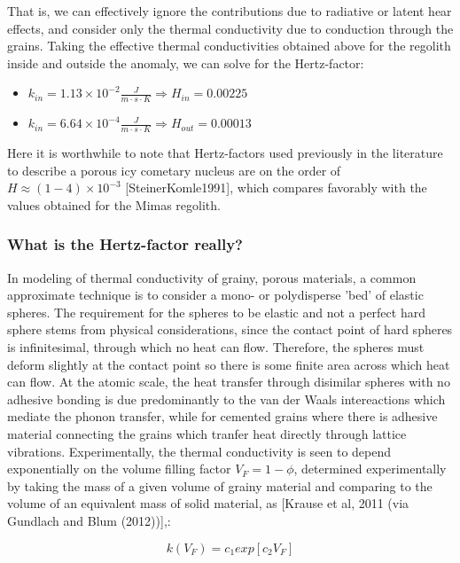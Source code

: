 \documentclass[11pt]{article} %
\newcommand{\vf}{\ensuremath{V_{F}}\xspace}
\begin{document}
	That is, we can effectively ignore the contributions due to radiative or latent hear effects, and consider only the thermal conductivity due to conduction through the grains. Taking the effective thermal conductivities obtained above for the regolith inside and outside the anomaly, we can solve for the Hertz-factor:
	
	\begin{itemize}
	\item $k_{in} = 1.13\times10^{-2} \frac{J}{m \cdot s \cdot K} \Rightarrow H_{in} = 0.00225$
	\item $k_{in} = 6.64\times10^{-4} \frac{J}{m \cdot s \cdot K} \Rightarrow H_{out} = 0.00013$
	\end{itemize}
	
	Here it is worthwhile to note that Hertz-factors used previously in the literature to describe a porous icy cometary nucleus are on the order of  $H  \approx (1 - 4) \times10^{-3}$ [SteinerKomle1991], which compares favorably with the values obtained for the Mimas regolith. 
	
\subsubsection{What is the Hertz-factor really?}

	In modeling of thermal conductivity of grainy, porous materials, a common approximate technique is to consider a mono- or polydisperse 'bed' of elastic spheres. The requirement for the spheres to be elastic and not a perfect hard sphere stems from physical considerations, since the contact point of hard spheres is infinitesimal, through which no heat can flow. Therefore, the spheres must deform slightly at the contact point so there is some finite area across which heat can flow. At the atomic scale, the heat transfer through disimilar spheres with no adhesive bonding is due predominantly to the van der Waals intereactions which mediate the phonon transfer, while for cemented grains where there is adhesive material connecting the grains which tranfer heat directly through lattice vibrations. 
	Experimentally, the thermal conductivity is seen to depend exponentially on the volume filling factor $\vf = 1- \phi$, determined experimentally by taking the mass of a given volume of grainy material and comparing to the volume of an equivalent mass of solid material, as [Krause et al, 2011 (via Gundlach and Blum (2012))],:
	
	\begin{equation}
	k(\vf) = c_{1} exp [c_{2} \vf]
	\end{equation}
\end{document}
